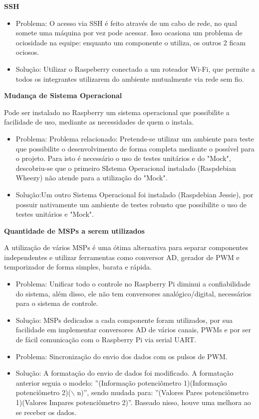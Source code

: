  \textbf{SSH}

 \begin{itemize}
      \item Problema:  O acesso via SSH é feito através de um cabo de rede, no qual somete uma máquina por vez pode acessar. Isso ocasiona um problema de ociosidade na equipe: enquanto um componente o utiliza, os outros 2 ficam ociosos.
	  \item Solução: Utilizar o Raspeberry conectado a um roteador Wi-Fi, que permite a todos os integrantes utilizarem do ambiente mutualmente via rede sem fio.
    \end{itemize}

  \textbf{Mudança de Sistema Operacional}

Pode ser instalado no Raspberry um sistema operacional que possibilite a facilidade de uso, mediante as necessidades de quem o instala.
 \begin{itemize}
      \item Problema:  Problema relacionado: Pretende-se utilizar um ambiente para teste que possibilite o desenvolvimento de forma completa mediante o possível para o projeto. Para isto é necessário o uso de testes unitários e do "Mock", descobriu-se que o primeiro SIstema Operacional instalado (Raspdebian Wheezy) não atende para a utilização do "Mock".

	  \item Solução:Um outro Sistema Operacional foi instalado (Raspdebian Jessie), por possuir nativamente um ambiente de testes robusto que possibilite o uso de testes unitários e "Mock".
    \end{itemize}

\textbf{Quantidade de MSPs a serem utilizados}

A utilização de vários MSPs é uma ótima alternativa para separar componentes independentes e utilizar ferramentas como conversor AD, gerador de PWM e temporizador de forma simples, barata e rápida.
  \begin{itemize}
   \item Problema: Unificar todo o controle no Raspberry Pi diminui a confiabilidade do sistema, além disso, ele não tem conversores analógico/digital, necessários para o sistema de controle.

	\item Solução: MSPs dedicados a cada componente foram utilizados, por sua facilidade em implementar conversores AD de vários canais, PWMs e por ser de fácil comunicação com o Raspberry Pi via serial UART.
    \item Problema: Sincronização do envio dos dados com os pulsos de PWM.
    \item Solução: A formatação do envio de dados foi modificado. A formatação anterior seguia o modelo: ''(Informação potenciômetro 1)(Informação potenciômetro 2)($\backslash$ n)'', sendo mudada para: ''(Valores Pares potenciômetro 1)(Valores Impares potenciômetro 2)''. Baseado nisso, houve uma melhora ao se receber os dados.
  \end{itemize}

